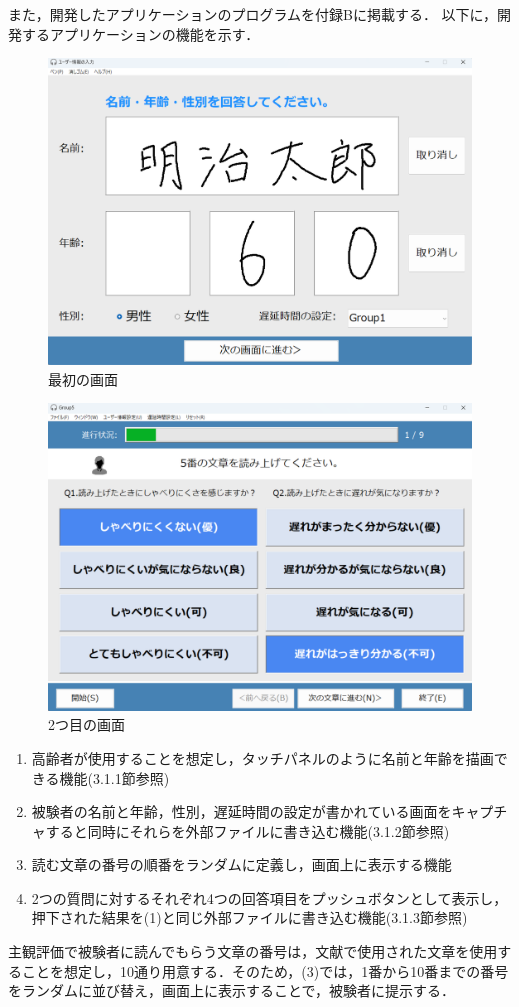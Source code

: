 また，開発したアプリケーションのプログラムを付録Bに掲載する．
以下に，開発するアプリケーションの機能を示す．
\begin{figure}[tbp]
  \centering
  \includegraphics[scale=0.25]{figures/Syukann/gamen_1.png}
  \caption{最初の画面}
  \label{fig:1_userInterface}
\end{figure}
\begin{figure}[tbp]
  \centering
  \includegraphics[scale=0.25]{figures/Syukann/app_2.png}
  \caption{2つ目の画面}
  \label{fig:2_userInterface}
\end{figure}
\begin{enumerate}[leftmargin=*]
  \item 高齢者が使用することを想定し，タッチパネルのように名前と年齢を描画できる機能(3.1.1節参照)
  \item 被験者の名前と年齢，性別，遅延時間の設定が書かれている画面をキャプチャすると同時にそれらを外部ファイルに書き込む機能(3.1.2節参照)
  \item 読む文章の番号の順番をランダムに定義し，画面上に表示する機能
  \item 2つの質問に対するそれぞれ4つの回答項目をプッシュボタンとして表示し，押下された結果を(1)と同じ外部ファイルに書き込む機能(3.1.3節参照)
\end{enumerate}
主観評価で被験者に読んでもらう文章の番号は，文献\cite{kayama}で使用された文章を使用することを想定し，10通り用意する．そのため，(3)では，1番から10番までの番号をランダムに並び替え，画面上に表示することで，被験者に提示する．
